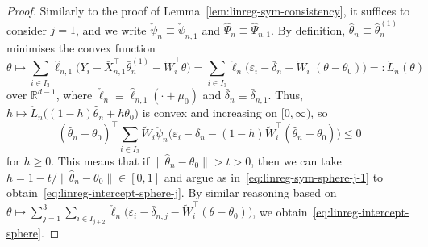 \documentclass[a4paper]{article}
\newcommand{\R}{\mathbb{R}}
\newcommand{\norm}[1]{\|{#1}\|}
\theoremstyle{definition}
\begin{document}
\begin{proof}
Similarly to the proof of Lemma~\ref{lem:linreg-sym-consistency}, it suffices to consider $j = 1$, and we write $\check{\psi}_n \equiv \check{\psi}_{n,1}$ and $\hat{\Psi}_n \equiv \hat{\Psi}_{n,1}$. By definition, $\hat{\theta}_n \equiv \hat{\theta}_n^{(1)}$ minimises the convex function 
\[
\theta \mapsto \sum_{i \in I_3} \hat{\ell}_{n,1}\bigl(Y_i - \bar{X}_{n,1}^\top\bar{\theta}_n^{(1)} - \tilde{W}_i^\top\theta\bigr) = \sum_{i \in I_3} \check{\ell}_n\bigl(\varepsilon_i - \bar{\delta}_n - \tilde{W}_i^\top(\theta - \theta_0)\bigr) =: \check{L}_n(\theta) 
\]
over $\R^{d-1}$, where $\check{\ell}_n \equiv \hat{\ell}_{n,1}(\cdot + \mu_0)$ and $\bar{\delta}_n \equiv \bar{\delta}_{n,1}$. Thus, $h \mapsto \check{L}_n\bigl((1 - h)\hat{\theta}_n + h\theta_0\bigr)$ is convex and increasing on $[0,\infty)$, so 
\[
(\hat{\theta}_n - \theta_0)^\top\sum_{i \in I_3} \tilde{W}_i\check{\psi}_n\bigl(\varepsilon_i - \bar{\delta}_n - (1-h)\tilde{W}_i^\top(\hat{\theta}_n - \theta_0)\bigr) \leq 0
\]
for $h \geq 0$. This means that if $\norm{\hat{\theta}_n - \theta_0} > t > 0$, then we can take $h = 1 - t/\norm{\hat{\theta}_n - \theta_0} \in [0,1]$ and argue as in~\eqref{eq:linreg-sym-sphere-j-1} to obtain~\eqref{eq:linreg-intercept-sphere-j}. By similar reasoning based on $\theta \mapsto \sum_{j=1}^3 \sum_{i \in I_{j+2}} \check{\ell}_n\bigl(\varepsilon_i - \bar{\delta}_{n,j} - \tilde{W}_i^\top(\theta - \theta_0)\bigr)$, we obtain~\eqref{eq:linreg-intercept-sphere}.


\end{proof}
\end{document}
